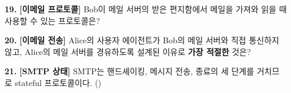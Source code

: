 \documentclass[a4paper, 10pt]{article}
\begin{document}
\begin{enumerate}[itemsep=3em, leftmargin=2em, label={}]
\begin{mchoice}
\end{mchoice}



\item[\textbf{19.}] \textbf{[이메일 프로토콜]} Bob이 메일 서버의 받은 편지함에서 메일을 가져와 읽을 때 사용할 수 있는 프로토콜은?






\item[\textbf{20.}] \textbf{[이메일 전송]} Alice의 사용자 에이전트가 Bob의 메일 서버와 직접 통신하지 않고, Alice의 메일 서버를 경유하도록 설계된 이유로 \textbf{가장 적절한} 것은?






\item[\textbf{21.}] \textbf{[SMTP 상태]} SMTP는 핸드셰이킹, 메시지 전송, 종료의 세 단계를 거치므로 stateful 프로토콜이다. (\hspace{1cm})








\end{enumerate}
\end{document}
